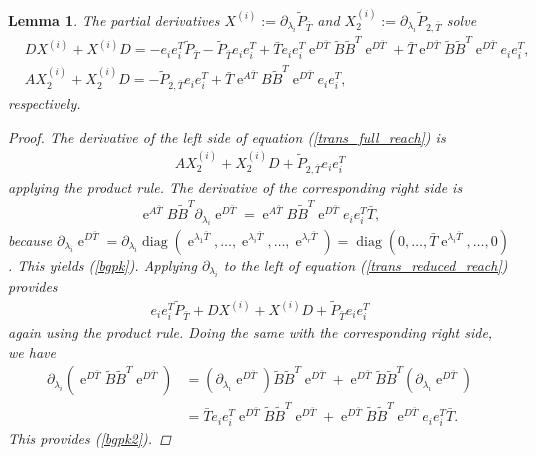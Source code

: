 \documentclass[a4paper,11pt, twoside]{article}
\newcommand{\expn}{\operatorname{e}}
\newcommand{\diag}{\operatorname{diag}}
\newtheorem{lem}[defn]{Lemma}
\begin{document}
\begin{lem}\label{lem:eq:derivatives} 
The partial derivatives $X^{(i)}:=\partial_{\lambda_i} \tilde P_{\bar T}$ and $X_2^{(i)}:=\partial_{\lambda_i} \tilde P_{2, \bar T}$ solve 
\begin{align}\label{bgpk}
&DX^{(i)}+X^{(i)} D =-e_ie_i^T\tilde P_{\bar T}-\tilde P_{\bar T}e_ie_i^T+\bar T 
e_ie_i^T\expn^{D \bar T}\tilde B \tilde B^T \expn^{D \bar T}+\bar T\expn^{D \bar T}\tilde B \tilde B^T \expn^{D \bar T}e_ie_i^T,                 \\
&A X_2^{(i)}+ X_2^{(i)} D =-\tilde P_{2, {\bar T}} e_ie_i^T+\bar T \expn^{A 
	\bar T}B \tilde B^T \expn^{D \bar T}e_ie_i^T, \label{bgpk2}
                                       \end{align}
respectively.
\begin{proof}
The derivative of the left side of equation (\ref{trans_full_reach}) is\begin{align*}
A X_2^{(i)}+ X_2^{(i)} D + \tilde P_{2, {\bar T}}e_i e_i^T
\end{align*} applying the product rule. The derivative of the corresponding right side is \begin{align*}
\expn^{A \bar T}B \tilde B^T \partial_{\lambda_i} \expn^{D \bar T} = \expn^{A \bar T}B \tilde B^T \expn^{D \bar T} e_i e_i^T 
\bar T, 
\end{align*}
because $\partial_{\lambda_i} \expn^{D \bar T}=\partial_{\lambda_i} \diag(\expn^{\lambda_1 \bar T}, \ldots, \expn^{\lambda_i \bar T}, \ldots, 
\expn^{\lambda_r \bar T})=\diag(0, \ldots, \bar T\expn^{\lambda_i \bar T}, \ldots, 0)$. This yields (\ref{bgpk}). Applying $\partial_{\lambda_i}$ to 
the left of equation (\ref{trans_reduced_reach}) provides
\begin{align*}
e_ie_i^T\tilde P_{\bar T}+D X^{(i)}+X^{(i)} D+\tilde P_{\bar T} e_ie_i^T                   
                                       \end{align*}
again using the product rule. Doing the same with the corresponding right side, we have \begin{align*}
  \partial_{\lambda_i}(\expn^{D \bar T}\tilde B \tilde B^T \expn^{D \bar T})&=    (\partial_{\lambda_i}\expn^{D \bar T})\tilde B \tilde B^T \expn^{D 
\bar T}+ \expn^{D \bar T}\tilde B \tilde B^T (\partial_{\lambda_i}\expn^{D \bar T})\\ &=   \bar T e_i e_i^T\expn^{D \bar T}\tilde B \tilde B^T 
\expn^{D \bar T}+ \expn^{D \bar T}\tilde B \tilde B^T \expn^{D \bar T} e_i e_i^T \bar T.                                                           
                                 \end{align*}
This provides (\ref{bgpk2}).
\end{proof}
\end{lem}
\end{document}
